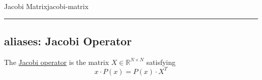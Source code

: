 \begin{definition}{Jacobi Matrix}{jacobi-matrix}
  \begin{center}\rule{0.5\linewidth}{0.5pt}\end{center}

  \hypertarget{aliases-jacobi-operator}{%
    \subsection{aliases: Jacobi Operator}\label{aliases-jacobi-operator}}

  The \href{https://en.wikipedia.org/wiki/Jacobi_operator}{Jacobi
    operator} is the matrix \(X \in \mathbb{R}^{N \times N}\) satisfying
  \[x \cdot P(x) = P(x) \cdot X^T\]
\end{definition}
